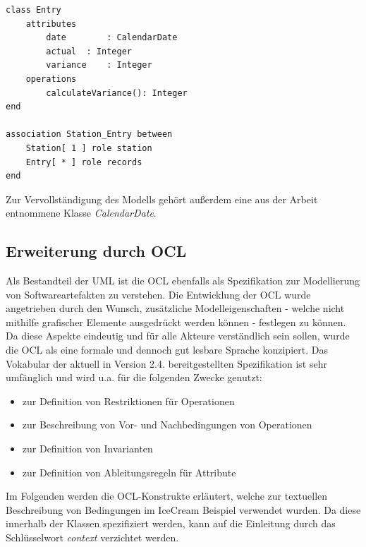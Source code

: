 \documentclass[a4paper,twoside]{article}
\begin{document}
\begin{lstlisting}[caption={USE-Spezifikation der Klasse Entry und der Assoziation zwischen einer Station und deren Entries},label=lst:assocs2]
class Entry
	attributes
		date		: CalendarDate
		actual	: Integer
		variance	: Integer
	operations
		calculateVariance(): Integer 
end

association Station_Entry between
	Station[ 1 ] role station
	Entry[ * ] role records
end
\end{lstlisting}

Zur Vervollständigung des Modells gehört außerdem eine aus der Arbeit \cite{SilvaMasterThesis} entnommene Klasse \textit{CalendarDate}.

\subsection{Erweiterung durch OCL} 
\label{ssec:ocl}
Als Bestandteil der UML ist die OCL ebenfalls als Spezifikation zur Modellierung von Softwareartefakten zu verstehen. Die Entwicklung der OCL wurde angetrieben durch den Wunsch, zusätzliche Modelleigenschaften - welche nicht mithilfe grafischer Elemente ausgedrückt werden können - festlegen zu können. \cite[S.5f]{OCLFormal} Da diese Aspekte eindeutig und für alle Akteure verständlich sein sollen, wurde die OCL als eine formale und dennoch gut lesbare Sprache konzipiert. Das Vokabular der aktuell in Version 2.4. bereitgestellten Spezifikation ist sehr umfänglich und wird u.a. für die folgenden Zwecke genutzt: \begin{itemize}
\item zur Definition von Restriktionen für Operationen
\item zur Beschreibung von Vor- und Nachbedingungen von Operationen 
\item zur Definition von Invarianten
\item zur Definition von Ableitungsregeln für Attribute
\end{itemize} 
Im Folgenden werden die OCL-Konstrukte erläutert, welche zur textuellen Beschreibung von Bedingungen im IceCream Beispiel verwendet wurden. Da diese innerhalb der Klassen spezifiziert werden, kann auf die Einleitung durch das Schlüsselwort \textit{context} verzichtet werden.
\\
\end{document}
